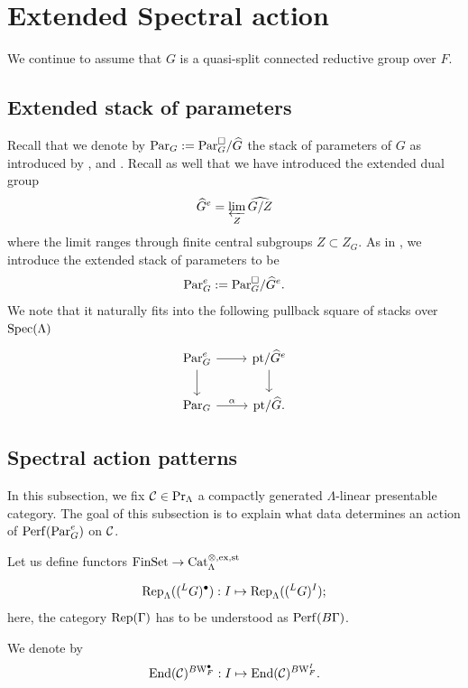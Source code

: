 \section{Extended Spectral action}\label{sec:extended-spectral}
We continue to assume that $G$ is a quasi-split connected reductive group over $F$.
\subsection{Extended stack of parameters}

Recall that we denote by $\mathrm{Par}_G := \mathrm{Par}_G^{\square}/\widehat{G}$ the stack of parameters of $G$ as introduced by \cite{Geometrization}, \cite{DHKM} and \cite{ZhuCoherentSheaves}. Recall as well that we have introduced the extended dual group
$$\widehat{G}^e = \varprojlim_{Z} \widehat{G/Z}$$
where the limit ranges through finite central subgroups $Z \subset Z_G$. As in \cite{Fargues22}, we introduce the extended stack of parameters to be 
$$\mathrm{Par}_G^e := \mathrm{Par}_G^{\square}/\widehat{G}^e.$$
We note that it naturally fits into the following pullback square of stacks over $\mathrm{Spec}(\Lambda)$ 
\begin{equation}\label{eq:diag-defi-par-g-e}
    \begin{tikzcd}
	{\Par_G^e} & {\pt/\widehat{G}^e} \\
	{\Par_G} & {\pt/\widehat{G}.}
	\arrow[from=1-1, to=1-2]
	\arrow[from=1-1, to=2-1]
	\arrow[from=1-2, to=2-2]
	\arrow["\alpha", from=2-1, to=2-2]
\end{tikzcd}
\end{equation}

\subsection{Spectral action patterns}

In this subsection, we fix $\mathcal{C} \in \Pr_{\Lambda}$ a  compactly generated $\Lambda$-linear presentable category. The goal of this subsection is to explain what data determines an action of $\mathrm{Perf}(\mathrm{Par}_G^e)$ on $\mathcal{C}$.

Let us define functors $\mathrm{FinSet} \to \mathrm{Cat}^{\otimes, \mathrm{ex}, \mathrm{st}}_{\Lambda}$

\begin{equation*}
\mathrm{Rep}_{\Lambda}(({^L}G)^{\bullet}) : I \mapsto \mathrm{Rep}_{\Lambda}(({^L}G)^I);
\end{equation*}
here, the category $\mathrm{Rep}(\Gamma)$ has to be understood as $\mathrm{Perf}(B\Gamma)$.

We denote by
\begin{equation*}\label{eq:natTransB}
\mathrm{End}(\mathcal{C})^{B\mathrm{W}_F^{\bullet}} : I \mapsto \mathrm{End}(\mathcal{C})^{B\mathrm{W}_F^I}.
\end{equation*}

